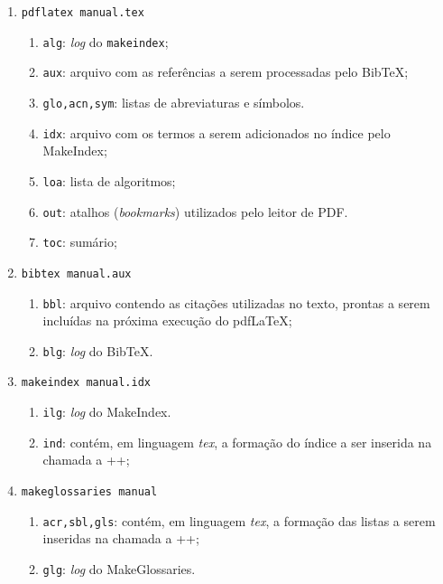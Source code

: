 \documentclass{fei}
\begin{document}
	\begin{enumerate}
	
	\item\verb+pdflatex manual.tex+
	\begin{enumerate}
	\item \texttt{alg}: \emph{log} do \texttt{makeindex};
	\item \texttt{aux}: arquivo com as referências a serem processadas pelo Bib\TeX;
	\item \texttt{glo,acn,sym}: listas de abreviaturas e símbolos.
	\item \texttt{idx}: arquivo com os termos a serem adicionados no índice pelo MakeIndex;	
	\item \texttt{loa}: lista de algoritmos;
	\item \texttt{out}: atalhos (\emph{bookmarks}) utilizados pelo leitor de PDF.
	\item \texttt{toc}: sumário;
	\end{enumerate}	
	
	\item\verb+bibtex manual.aux+
	\begin{enumerate}
	\item \texttt{bbl}: arquivo contendo as citações utilizadas no texto, prontas a serem incluídas na próxima execução do pdf\LaTeX;
	\item \texttt{blg}: \emph{log} do Bib\TeX.
	\end{enumerate}	
	
	\item\verb+makeindex manual.idx+
	\begin{enumerate}
	\item \texttt{ilg}: \emph{log} do MakeIndex.
	\item \texttt{ind}: contém, em linguagem \emph{tex}, a formação do índice a ser inserida na chamada a \latexinline+\printindex+;
	\end{enumerate}	
	
	\item\verb+makeglossaries manual+
	\begin{enumerate}
	\item \texttt{acr,sbl,gls}:  contém, em linguagem \emph{tex}, a formação das listas a serem inseridas na chamada a \latexinline+\printglossaries+;
	\item \texttt{glg}: \emph{log} do MakeGlossaries.
	\end{enumerate}
	\end{enumerate}
	
\end{document}
